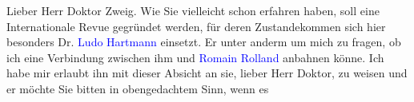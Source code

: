 \pstart\center{}Lieber Herr Doktor Zweig.\pend\vspace{0.5em}
\pstart
           Wie Sie vielleicht schon erfahren haben, soll eine Internationale Revue gegründet
               werden, für deren Zustandekommen sich hier besonders Dr. \textcolor{blue}{Ludo Hartmann}\ledrightnote{\textcolor{blue}{Ludo Moritz Hartmann}} einsetzt. Er \label{K_L03776-1v}\label{K_L03776-1} unter anderm um mich zu fragen, ob ich
               eine Verbindung zwischen ihm und \textcolor{blue}{Romain
                  Rolland}\ledrightnote{\textcolor{blue}{Romain Rolland}} anbahnen könne. Ich habe mir erlaubt ihn mit dieser Absicht an sie,
               lieber Herr Doktor, zu weisen und er möchte Sie bitten in obengedachtem Sinn, wenn es
